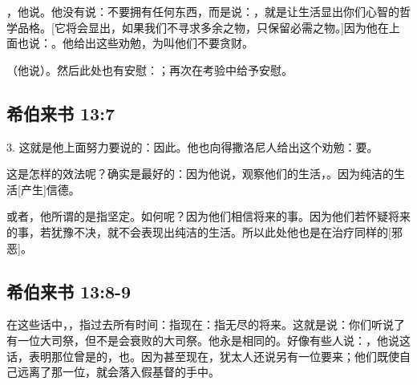 ，他说。他没有说：不要拥有任何东西，而是说：，就是让生活显出你们心智的哲学品格。[它将会显出，如果我们不寻求多余之物，只保留必需之物。]因为他在上面也说：。他给出这些劝勉，为叫他们不要贪财。\par

（他说）。然后此处也有安慰：；再次在考验中给予安慰。\par


\subsection{希伯来书 13:7}

3. 这就是他上面努力要说的：因此。他也向得撒洛尼人给出这个劝勉：要。\par

这是怎样的效法呢？确实是最好的：因为他说，观察他们的生活，。因为纯洁的生活[产生]信德。\par

或者，他所谓的是指坚定。如何呢？因为他们相信将来的事。因为他们若怀疑将来的事，若犹豫不决，就不会表现出纯洁的生活。所以此处他也是在治疗同样的[邪恶]。\par


\subsection{希伯来书 13:8-9}

\par

在这些话中，，指过去所有时间：指现在：指无尽的将来。这就是说：你们听说了有一位大司祭，但不是会衰败的大司祭。他永是相同的。好像有些人说：，他说这话，表明那位曾是的，也。因为甚至现在，犹太人还说另有一位要来；他们既使自己远离了那一位，就会落入假基督的手中。\par

